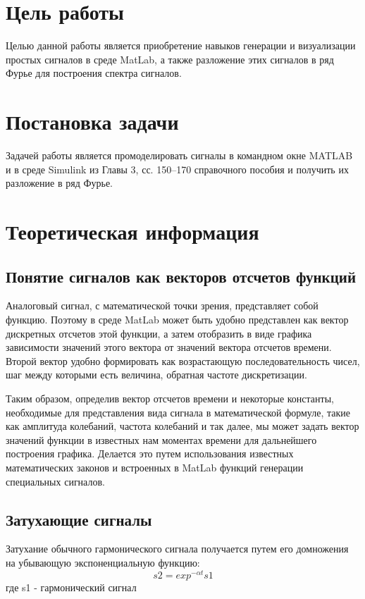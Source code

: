 







\section{Цель работы}
Целью данной работы является приобретение навыков генерации и визуализации простых сигналов в среде MatLab, а также разложение этих сигналов в ряд Фурье для построения спектра сигналов.

\section{Постановка задачи}
Задачей работы является промоделировать сигналы в командном окне MATLAB и в среде Simulink из Главы 3, сс. 150–170 справочного пособия и получить их разложение в ряд Фурье.

\section{Теоретическая информация}
\subsection{Понятие сигналов как векторов отсчетов функций}
Аналоговый сигнал, с математической точки зрения, представляет собой функцию. Поэтому в среде  MatLab может быть удобно представлен как вектор дискретных отсчетов этой функции, а затем отобразить в виде графика зависимости значений этого вектора от значений вектора отсчетов времени. Второй вектор удобно формировать как возрастающую последовательность чисел, шаг между которыми есть величина, обратная частоте дискретизации.

Таким образом, определив вектор отсчетов времени и некоторые константы, необходимые для представления вида сигнала в математической формуле, такие как амплитуда колебаний, частота колебаний и так далее, мы может задать вектор значений функции в известных нам моментах времени для дальнейшего построения графика. Делается это путем использования известных математических законов и встроенных в MatLab функций генерации специальных сигналов.

\subsection{Затухающие сигналы}
Затухание обычного гармонического сигнала получается путем его домножения на убывающую экспоненциальную функцию:
\begin{equation}
	s2 = exp^{-\alpha t}  s1
\end{equation}
где s1 - гармонический сигнал

